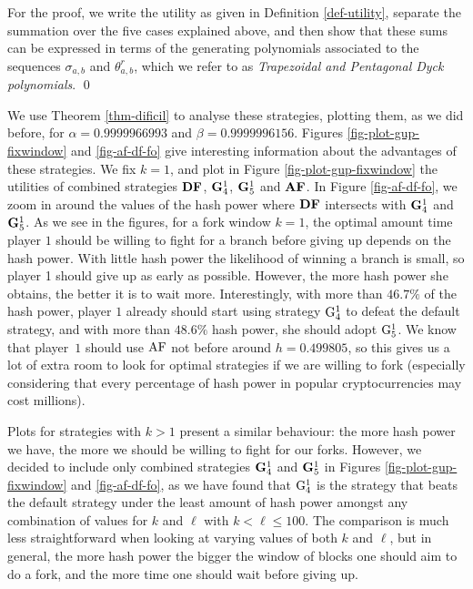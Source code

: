  For the proof, we write the utility as given in Definition \ref{def-utility}, separate the summation 
 over the five cases explained above, and then show that these sums can be expressed in terms of the 
 generating polynomials associated to the sequences $\sigma_{a,b}$ and $\theta_{a,b}^r$, which we
refer to as \textit{Trapezoidal and Pentagonal Dyck polynomials}.
\qed

\medskip

We use Theorem \ref{thm-dificil} to analyse these strategies, plotting them, as we did before, 
for $\alpha = 0.9999966993$ and $\beta = 0.9999996156$. Figures  \ref{fig-plot-gup-fixwindow} and \ref{fig-af-df-fo} give 
interesting 
information about the advantages of these strategies. 
We fix $k = 1$, and plot in Figure \ref{fig-plot-gup-fixwindow} the utilities of combined strategies $\text{\rm {\bf DF}}$, ${\rm {\bf G}}^1_4$, ${\rm {\bf G}}^1_5$ and $\text{\rm {\bf AF}}$. In Figure \ref{fig-af-df-fo}, we zoom in around the values of the hash power where $\text{\rm {\bf DF}}$ intersects with ${\rm {\bf G}}^1_4$ and ${\rm {\bf G}}^1_5$.
As we see in the figures, for a 
fork window $k = 1$, the optimal amount time player $1$ should be willing to fight for a branch before giving up depends on the hash power. With little hash power the likelihood of winning a 
branch is small, so player 1 should give up as early as possible. However, the more hash power she obtains, the better it is to wait more. Interestingly, with more than 
$46.7\%$ of the hash power, player $1$ already should start using strategy ${\rm {G}}^1_4$ to defeat the default strategy, and with more than $48.6\%$ hash power, she should adopt ${\rm {G}}^1_5$. We know that player~$1$ should use $\text{\rm AF}$ not before around $h = 0.499805$, so this gives us a lot of extra room to look for optimal strategies if we are willing to fork (especially considering that every percentage of hash power in popular cryptocurrencies 
may cost millions).

Plots for strategies with $k > 1$ present a similar behaviour: the more hash power we have, the more we should be willing to fight for our forks. However, we decided to include only combined strategies ${\rm {\bf G}}^1_4$ and ${\rm {\bf G}}^1_5$ in Figures \ref{fig-plot-gup-fixwindow} and \ref{fig-af-df-fo},
as we have found that 
${\rm {G}}^1_4$ is the strategy that beats the default strategy under the least amount of hash power 
amongst any combination of values for $k$ and $\ell$ with $k < \ell \leq 100$. The comparison is much less straightforward when looking at varying values of both $k$ and $\ell$, but in general, 
the more hash power the bigger the window of blocks one should aim to do a fork, and the more time one should wait before giving up. 

